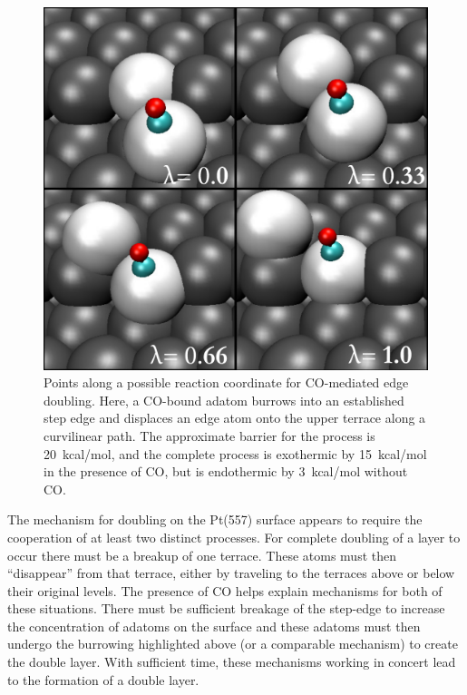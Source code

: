 \begin{figure}[p!]
\centering
\includegraphics[width=\linewidth]{../figures/chap2/rxn.pdf}
\caption{Points along a possible reaction coordinate for CO-mediated
  edge doubling. Here, a CO-bound adatom burrows into an established
  step edge and displaces an edge atom onto the upper terrace along a
  curvilinear path.  The approximate barrier for the process is
  20~kcal/mol, and the complete process is exothermic by 15~kcal/mol
  in the presence of CO, but is endothermic by 3~kcal/mol without CO.}
\label{fig:lambda}
\end{figure}

The mechanism for doubling on the Pt(557) surface appears to require
the cooperation of at least two distinct processes. For complete
doubling of a layer to occur there must be a breakup of one
terrace. These atoms must then ``disappear'' from that terrace, either
by traveling to the terraces above or below their original levels.
The presence of CO helps explain mechanisms for both of these
situations. There must be sufficient breakage of the step-edge to
increase the concentration of adatoms on the surface and these adatoms
must then undergo the burrowing highlighted above (or a comparable
mechanism) to create the double layer.  With sufficient time, these
mechanisms working in concert lead to the formation of a double layer.

